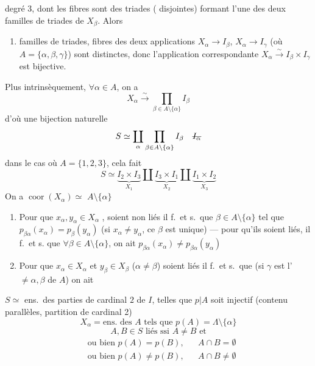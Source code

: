 \documentclass[11pt,a4paper]{article}
\begin{document}
 degré 3, dont les  fibres sont des  triades
( disjointes) formant l'une des deux
familles de triades de $X_\beta$. Alors
\begin{enumerate}
\item[a)]    familles de triades, fibres des
deux applications $X_\alpha \to I_\beta$, $X_\alpha \to I_\gamma$ (où \struck{\ill{}}
$A = \{\alpha,\beta,\gamma\}$) sont distinctes, donc l'application
correspondante $X_\alpha \xrightarrow{\sim} I_\beta \times I_\gamma$ est bijective.
\end{enumerate}
Plus intrinsèquement, $\forall \alpha \in A$, on a
\[
X_\alpha \xrightarrow{\sim} \prod_{\beta \in A\setminus\{\alpha\}} I_\beta
\]
d'où une bijection naturelle
\[
S \simeq \coprod_{\alpha} \prod_{\beta\in A\setminus\{\alpha\}} I_\beta \quad \text{\struck{$I_\alpha$}}
\]
dans le cas où $A = \{1,2,3\}$, cela fait
\[
S \simeq \underbrace{I_2 \times I_3}_{X_1} \amalg \underbrace{I_3 \times I_1}_{X_2} \amalg \underbrace{I_1 \times I_2}_{X_3}
\]
On a $\operatorname{coor}(X_\alpha) \simeq{}$ \ill{} $A \setminus \{\alpha\}$
\begin{enumerate}
\item[c)] Pour que  \add{\ill{}} $x_\alpha, y_\alpha \in X_\alpha$ \struck{\ill{}},
soient non liés il f.\ et s.\ que \struck{$\exists$} $\beta \in A \setminus\{\alpha\}$ \struck{\ill{}}
tel que $p_{\beta\alpha}(x_\alpha) = p_\beta(y_\alpha)$ (si $x_\alpha \neq y_\alpha$, ce $\beta$ est
unique) --- pour qu'ils soient liés, il f.\ et s.
que $\forall \beta \in A \setminus \{\alpha\}$, on ait $p_{\beta\alpha}(x_\alpha) \neq p_{\beta\alpha}(y_\alpha)$
\item[d)] Pour que $x_\alpha \in X_\alpha$ et $y_\beta \in X_\beta$ ($\alpha\neq\beta$) soient liés
il f.\ et s.\ que (si $\gamma$ \struck{\ill{}} \struck{\ill{}} est l'\struck{\ill{}}  $\neq \alpha,\beta$ de $A$) on ait
\end{enumerate}

$S \simeq$ ens.\ des parties  de cardinal $2$ de $I$,
telles que $p|A$ soit injectif (contenu parallèles, 
partition de cardinal 2)
\[
X_\alpha = \text{ens.\ des } A \text{ tels que } p(A) = \Lambda \setminus \{\alpha\}
\]
\[
A, B \in S \text{ liés ssi } A \neq B \text{ et}
\]
\[
\begin{aligned}
&\text{ou bien } p(A) = p(B), && A \cap B = \emptyset\\
&\text{ou bien } p(A) \neq p(B), && A \cap B \neq \emptyset
\end{aligned}
\]
\end{document}
